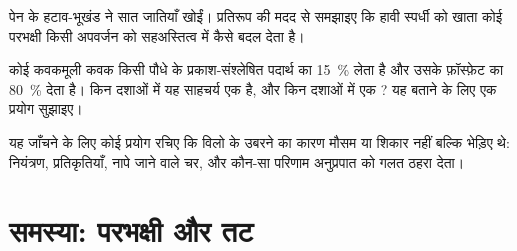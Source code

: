 \begin{exercise}[$\star\star\star$]\label{exo:b1:species-interactions:10}
पेन के हटाव-भूखंड ने सात जातियाँ खोईं।  प्रतिरूप की मदद से
समझाइए कि हावी स्पर्धी को खाता कोई परभक्षी किसी अपवर्जन को सहअस्तित्व
में कैसे बदल देता है।
\end{exercise}

\begin{exercise}[$\star\star\star$]\label{exo:b1:species-interactions:11}
कोई कवकमूली कवक किसी पौधे के प्रकाश-संश्लेषित पदार्थ का \qty{15}{\%} लेता
है और उसके फ़ॉस्फ़ेट का \qty{80}{\%} देता है। किन दशाओं में यह साहचर्य एक
 है, और किन दशाओं में एक ? यह बताने के लिए एक प्रयोग
सुझाइए।
\end{exercise}

\begin{exercise}[$\star\star\star$]\label{exo:b1:species-interactions:12}
यह जाँचने के लिए कोई प्रयोग रचिए कि विलो के उबरने का कारण मौसम या शिकार
नहीं बल्कि भेड़िए थे: नियंत्रण, प्रतिकृतियाँ, नापे जाने वाले चर, और
कौन-सा परिणाम अनुप्रपात को गलत ठहरा देता।
\end{exercise}

\section{समस्या: परभक्षी और तट}

